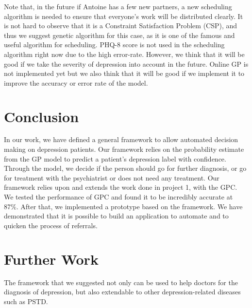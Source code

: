\documentclass{article}
\begin{document}
	
	
	Note that, in the future if Antoine has a few new partners, a new scheduling algorithm is needed to ensure that everyone's work will be distributed clearly.
	It is not hard to observe that it is a Constraint Satisfaction Problem (CSP), and thus we suggest genetic algorithm for this case, 
	as it is one of the famous and useful algorithm for scheduling. 
	PHQ-8 score is not used in the scheduling algorithm right now due to the high error-rate. 
	However, we think that it will be good if we take the severity of depression into account in the future. 
	Online GP is not implemented yet but we also think that it will be good if we implement it to improve the accuracy or error rate of the model.
	
	\section{Conclusion}	
	In our work, we have defined a general framework to allow automated decision making on depression patients. Our framework relies on the probability estimate from the GP model to predict a patient's depression label with confidence. Through the model, we decide if the person should go for further diagnosis, or go for treatment with the psychiatrist or does not need any treatment. Our framework relies upon and extends the work done in project 1, with the GPC. We tested the performance of GPC and found it to be incredibly accurate at 87\%. After that, we implemented a prototype based on the framework. We have demonstrated that it is possible to build an application to automate and to quicken the process of referrals.
	
	\section{Further Work}
	The framework that we suggested not only can be used to help doctors for the diagnosis of depression, but also extendable to other depression-related 
	diseases such as PSTD. 

	
\end{document}
